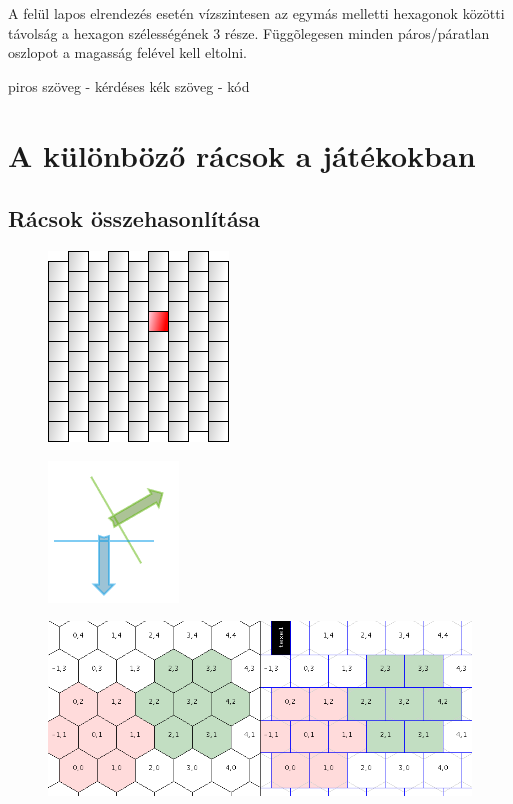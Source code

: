 A felül lapos elrendezés esetén vízszintesen az egymás melletti hexagonok közötti távolság a hexagon szélességének 3 része. Függõlegesen minden páros/páratlan oszlopot a magasság felével kell eltolni.


piros szöveg - kérdéses
kék szöveg - kód

\chapter{A különböző rácsok a játékokban}

\section{Rácsok összehasonlítása}

\begin{figure}[h]
\centering
\includegraphics[scale=0.7]{kepek/image13.png}
\caption{}
\label{fig:image13}
\end{figure}

\begin{figure}[h]
\centering
\includegraphics[scale=0.7]{kepek/image14.png}
\caption{}
\label{fig:image14}
\end{figure}

\begin{figure}[h]
\centering
\includegraphics[scale=0.7]{kepek/image15.png}
\caption{}
\label{fig:image15}
\end{figure}

